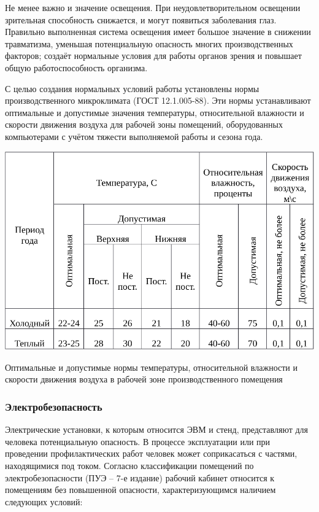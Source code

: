 Не менее важно и значение освещения. При неудовлетворительном освещении зрительная способность снижается, и могут появиться заболевания глаз. Правильно выполненная система освещения имеет большое значение в снижении травматизма, уменьшая потенциальную опасность многих производственных факторов; создаёт нормальные условия для работы органов зрения и повышает общую работоспособность организма.

С целью создания нормальных условий работы установлены нормы производственного микроклимата (ГОСТ 12.1.005-88). Эти нормы устанавливают оптимальные и допустимые значения температуры, относительной влажности и скорости движения воздуха для рабочей зоны помещений, оборудованных компьютерами с учётом тяжести выполняемой работы и сезона года.

\begin{table}[!ht]
\centering
\includegraphics[width=1\linewidth]{voltage_amper.pdf}
\caption{Оптимальные и допустимые нормы температуры, относительной влажности и скорости движения воздуха в рабочей зоне производственного помещения}
\label{tab:micro_climat}
\end{table}

\subsubsection{Электробезопасность}

Электрические установки, к которым относится ЭВМ и стенд, представляют для человека потенциальную опасность. В процессе эксплуатации или при проведении профилактических работ человек может соприкасаться с частями, находящимися под током. Согласно классификации помещений по электробезопасности (ПУЭ – 7-е издание) рабочий кабинет относится к помещениям без повышенной опасности, характеризующимся наличием следующих условий:

